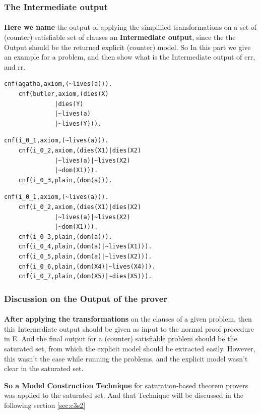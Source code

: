 	\subsubsection{The Intermediate output}
		\paragraph{}
		\textbf{Here we name} the output of applying the simplified transformations on a set of (counter) satisfiable set of clauses an \textbf{Intermediate output}, since the the Output should be the returned explicit (counter) model. So In this part we give an example for a problem, and then show what is the Intermediate output of \ac{crr}, and \ac{rr}. 		
		

			\begin{lstlisting}[caption=Satisfiable CNF problem Example,frame=single]
	cnf(agatha,axiom,(~lives(a))).
	cnf(butler,axiom,(dies(X)
			  |dies(Y)
			  |~lives(a)
			  |~lives(Y))).		
			\end{lstlisting}		
		
			\begin{lstlisting}[caption=CRR output Example,frame=single]
	cnf(i_0_1,axiom,(~lives(a))).
	cnf(i_0_2,axiom,(dies(X1)|dies(X2)
			  |~lives(a)|~lives(X2)
			  |~dom(X1))).
	cnf(i_0_3,plain,(dom(a))).
			\end{lstlisting}		

			\begin{lstlisting}[caption=RR output Example,frame=single]
	cnf(i_0_1,axiom,(~lives(a))).
	cnf(i_0_2,axiom,(dies(X1)|dies(X2)
			  |~lives(a)|~lives(X2)
			  |~dom(X1))).
	cnf(i_0_3,plain,(dom(a))).
	cnf(i_0_4,plain,(dom(a)|~lives(X1))).
	cnf(i_0_5,plain,(dom(a)|~lives(X2))).
	cnf(i_0_6,plain,(dom(X4)|~lives(X4))).
	cnf(i_0_7,plain,(dom(X5)|~dies(X5))).
			\end{lstlisting}		


	\subsubsection{Discussion on the Output of the prover}
		\paragraph{}
		\textbf{After applying the transformations} on the clauses of a given problem, then this Intermediate output should be given as input to the normal proof procedure in E. And the final output for a (counter) satisfiable problem should be the saturated set, from which the explicit model should be extracted easily. However, this wasn't the case while running the problems, and the explicit model wasn't clear in the saturated set.
		
		\textbf{So a Model Construction Technique} for saturation-based theorem provers was applied to the saturated set. And that Technique will be discussed in the following section \ref{sec:c3s2}   		